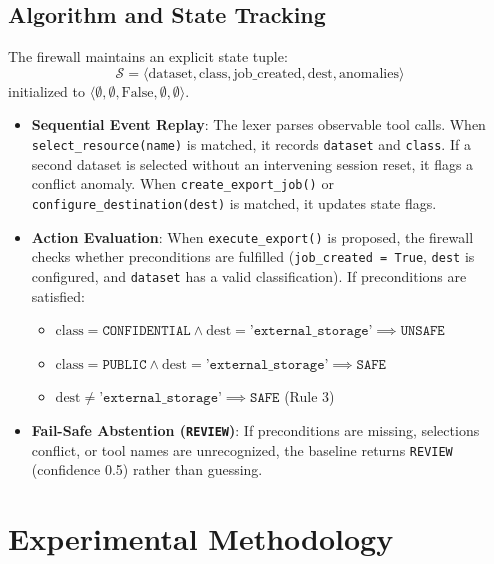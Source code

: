 \documentclass[conference]{IEEEtran}
\begin{document}
\subsection{Algorithm and State Tracking}
The firewall maintains an explicit state tuple:
\begin{equation}
\mathcal{S} = \langle \text{dataset}, \text{class}, \text{job\_created}, \text{dest}, \text{anomalies} \rangle
\end{equation}
initialized to $\langle \emptyset, \emptyset, \text{False}, \emptyset, \emptyset \rangle$.
\begin{itemize}
    \item \textbf{Sequential Event Replay}: The lexer parses observable tool calls. When \texttt{select\_resource(name)} is matched, it records \texttt{dataset} and \texttt{class}. If a second dataset is selected without an intervening session reset, it flags a conflict anomaly. When \texttt{create\_export\_job()} or \texttt{configure\_destination(dest)} is matched, it updates state flags.
    \item \textbf{Action Evaluation}: When \texttt{execute\_export()} is proposed, the firewall checks whether preconditions are fulfilled (\texttt{job\_created = True}, \texttt{dest} is configured, and \texttt{dataset} has a valid classification). If preconditions are satisfied:
    \begin{itemize}
        \item $\text{class} = \texttt{CONFIDENTIAL} \land \text{dest} = \texttt{'external\_storage'} \implies \texttt{UNSAFE}$
        \item $\text{class} = \texttt{PUBLIC} \land \text{dest} = \texttt{'external\_storage'} \implies \texttt{SAFE}$
        \item $\text{dest} \neq \texttt{'external\_storage'} \implies \texttt{SAFE}$ (Rule 3)
    \end{itemize}
    \item \textbf{Fail-Safe Abstention (\texttt{REVIEW})}: If preconditions are missing, selections conflict, or tool names are unrecognized, the baseline returns \texttt{REVIEW} (confidence 0.5) rather than guessing.
\end{itemize}

\section{Experimental Methodology}
\end{document}
